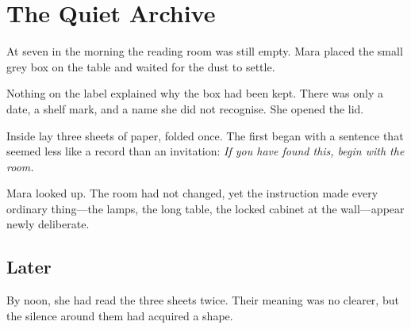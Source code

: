 \chapter{The Quiet Archive}
At seven in the morning the reading room was still empty. Mara placed the small grey box on the table and waited for the dust to settle.

Nothing on the label explained why the box had been kept. There was only a date, a shelf mark, and a name she did not recognise. She opened the lid.

\bigskip
Inside lay three sheets of paper, folded once. The first began with a sentence that seemed less like a record than an invitation: \emph{If you have found this, begin with the room.}

Mara looked up. The room had not changed, yet the instruction made every ordinary thing—the lamps, the long table, the locked cabinet at the wall—appear newly deliberate.

\section*{Later}
By noon, she had read the three sheets twice. Their meaning was no clearer, but the silence around them had acquired a shape.
